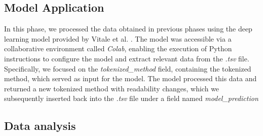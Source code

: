\subsection{Model Application} %
In this phase, we processed the data obtained in previous phases using the deep learning model provided by Vitale et al. \cite{Vitale2023}. The model was accessible via a collaborative environment called \textit{Colab}, enabling the execution of Python instructions to configure the model and extract relevant data from the \textit{.tsv} file. Specifically, we focused on the \textit{tokenized\_method} field, containing the tokenized method, which served as input for the model. The model processed this data and returned a new tokenized method with readability changes, which we subsequently inserted back into the \textit{.tsv} file under a field named \textit{model\_prediction}\newline

\subsection{Data analysis} %
\label{sec:Data analysis}


